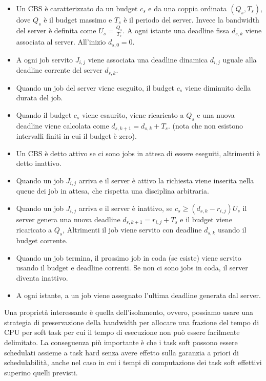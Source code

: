 \documentclass[12pt,openany,onesided]{book}
\begin{document}
\begin{itemize}
    \item Un CBS è caratterizzato da un budget $c_s$ e da una coppia ordinata $(Q_s,T_s)$, dove $Q_s$ è il budget massimo e $T_s$ è il periodo del server.
    Invece la bandwidth del server è definita come $U_s = \frac{Q_s}{T_s}$.
    A ogni istante una deadline fissa $d_{s,k}$ viene associata al server. All'inizio $d_{s,0} = 0$.
    \item A ogni job servito $J_{i,j}$ viene associata una deadline dinamica $d_{i,j}$ uguale alla deadline corrente del server $d_{s,k}$.
    \item Quando un job del server viene eseguito, il budget $c_s$ viene diminuito della durata del job.
    \item Quando il budget $c_s$ viene esaurito, viene ricaricato a $Q_s$ e una nuova deadline viene calcolata come $d_{s,k+1} = d_{s,k} + T_s$. (nota che non esistono intervalli finiti in cui il budget è zero).
    \item Un CBS è detto attivo se ci sono jobs in attesa di essere eseguiti, altrimenti è detto inattivo.
    \item Quando un job $J_{i,j}$ arriva e il server è attivo la richiesta viene inserita nella queue dei job in attesa, che rispetta una disciplina arbitraria.
    \item Quando un job $J_{i,j}$ arriva e il server è inattivo, se $c_s \geq (d_{s,k}-r_{i,j})U_s$ il server genera una nuova deadline $d_{s,k+1} = r_{i,j} + T_s$ e il budget viene ricaricato a $Q_s$,
    Altrimenti il job viene servito con deadline $d_{s,k}$ usando il budget corrente.
    \item Quando un job termina, il prossimo job in coda (se esiste) viene servito usando il budget e deadline correnti. Se non ci sono jobs in coda, il server diventa inattivo.
    \item A ogni istante, a un job viene assegnato l'ultima deadline generata dal server.
\end{itemize}
Una proprietà interessante è quella dell'isolamento, ovvero, possiamo usare una strategia di preservazione della bandwidth per allocare una frazione del tempo di CPU per soft task per cui il
tempo di esecuzione non può essere facilmente delimitato. La conseguenza più importante è che i task soft possono essere schedulati assieme a task hard senza avere effetto sulla garanzia a priori di schedulabilità,
anche nel caso in cui i tempi di computazione dei task soft effettivi superino quelli previsti.
\end{document}
